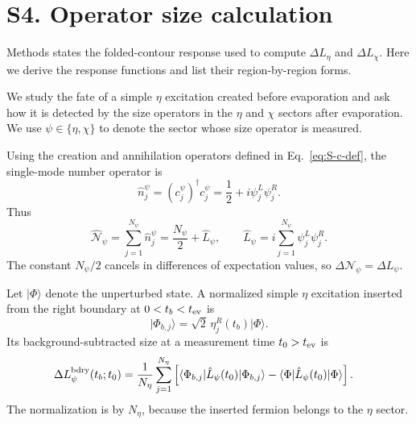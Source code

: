 \documentclass[11pt,a4paper]{article}
\begin{document}
\section*{S4. Operator size calculation}

\noindent
Methods states the folded-contour response used to compute \(\Delta L_\eta\)
and \(\Delta L_\chi\). Here we derive the response functions and list their
region-by-region forms.

We study the fate of a simple \(\eta\) excitation created before evaporation
and ask how it is detected by the size operators in the \(\eta\) and \(\chi\)
sectors after evaporation. We use \(\psi\in\{\eta,\chi\}\) to denote the
sector whose size operator is measured.

Using the creation and annihilation operators defined in
Eq.~\eqref{eq:S-c-def}, the single-mode number operator is
\begin{equation}
  \hat n^\psi_j
  =
  \left(c^\psi_j\right)^\dagger c^\psi_j
  =
  \frac{1}{2}
  +
  i\psi^L_j\psi^R_j .
\label{eq:S4-number-operator}
\end{equation}
Thus
\begin{equation}
  \widehat{\mathcal N}_\psi
  =
  \sum_{j=1}^{N_\psi}\hat n^\psi_j
  =
  \frac{N_\psi}{2}
  +
  \hat L_\psi,
  \qquad
  \hat L_\psi
  =
  i\sum_{j=1}^{N_\psi}\psi^L_j\psi^R_j .
\label{eq:S4-total-number}
\end{equation}
The constant \(N_\psi/2\) cancels in differences of expectation values, so
\(\Delta\mathcal N_\psi=\Delta L_\psi\).

Let \(\lvert\Phi\rangle\) denote the unperturbed state. A normalized simple
\(\eta\) excitation inserted from the right boundary at
\(0<t_b<t_{\rm ev}\) is
\begin{equation}
  \lvert\Phi_{b,j}\rangle
  =
  \sqrt{2}\,\eta^R_j(t_b)\lvert\Phi\rangle .
\label{eq:S4-boundary-excitation}
\end{equation}
Its background-subtracted size at a measurement time \(t_0>t_{\rm ev}\) is
\begin{equation}
\begin{aligned}
  \Delta L^{\rm bdry}_\psi(t_b;t_0)
  &=
  \frac{1}{N_\eta}
  \sum_{j=1}^{N_\eta}
  \left[
  \langle\Phi_{b,j}\rvert
  \hat L_\psi(t_0)
  \lvert\Phi_{b,j}\rangle
  -
  \langle\Phi\rvert
  \hat L_\psi(t_0)
  \lvert\Phi\rangle
  \right].
\end{aligned}
\label{eq:S4-physical-boundary-size}
\end{equation}
The normalization is by \(N_\eta\), because the inserted fermion belongs to
the \(\eta\) sector.
\end{document}
